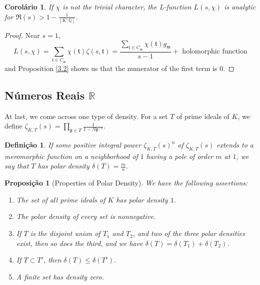 \documentclass{article}
\newcommand{\QQ}{\mathbb{Q}}
\newcommand{\RR}{\mathbb{R}}
\theoremstyle{plain}
\newtheorem{cor}{Corolário}
\newtheorem{prop}{Proposição}
\newtheorem{defn}{Definição}
\theoremstyle{remark}
\numberwithin{equation}{section}
\numberwithin{thm}{section}
\numberwithin{defn}{section}
\numberwithin{lemma}{section}
\numberwithin{axm}{section}
\begin{document}
\begin{cor}
If $\chi$ is not the trivial character, the L-function $L(s, \chi)$ is analytic for $\Re(s) > 1 - \frac{1}{[K : \QQ]}$.
\end{cor}

\begin{proof}
Near $s = 1$, $$L(s, \chi) = \sum_{\mathfrak{t} \in C_{\mathfrak{m}}} \chi(\mathfrak{t})\zeta(s, \mathfrak{t}) = \frac{\sum_{\mathfrak{t} \in C_{\mathfrak{m}}} \chi(\mathfrak{t})g_{\mathfrak{m}}}{s - 1} + \text{ holomorphic function}$$ and Proposition \ref{3.2} shows us that the numerator of the first term is $0$.
\end{proof}


\subsection{Números Reais \(\RR\)}

At last, we come across one type of density. For a set $T$ of prime ideals of $K$, we define $\zeta_{K, T}(s) = \prod_{\mathfrak{p} \in T} \frac{1}{1 - N\mathfrak{p}^{-s}}$. 

\begin{defn}
If some positive integral power $\zeta_{K, T}(s)^{n}$ of $\zeta_{K, T}(s)$ extends to a meromorphic function on a neighborhood of $1$ having a pole of order $m$ at $1$, we say that $T$ has polar density $\delta(T) = \frac{m}{n}$. 
\end{defn}

\begin{prop}[Properties of Polar Density]

We have the following assertions:

\begin{enumerate}
    \item The set of all prime ideals of $K$ has polar density $1$.
    \item The polar density of every set is nonnegative.
    \item If $T$ is the disjoint union of $T_1$ and $T_2$, and two of the three polar densities exist, then so does the third, and we have $\delta(T) = \delta(T_1) + \delta(T_2)$.
    \item If $T \subset T'$, then $\delta(T) \leq \delta(T')$.
    \item A finite set has density zero. 
\end{enumerate}

\end{prop}
\end{document}

